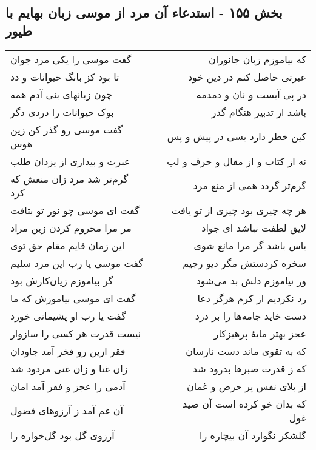 \begin{center}
\section*{بخش ۱۵۵ - استدعاء آن مرد از موسی زبان بهایم با طیور}
\label{sec:sh155}
\begin{longtable}{l p{0.5cm} r}
گفت موسی را یکی مرد جوان
&&
که بیاموزم زبان جانوران
\\
تا بود کز بانگ حیوانات و دد
&&
عبرتی حاصل کنم در دین خود
\\
چون زبانهای بنی آدم همه
&&
در پی آبست و نان و دمدمه
\\
بوک حیوانات را دردی دگر
&&
باشد از تدبیر هنگام گذر
\\
گفت موسی رو گذر کن زین هوس
&&
کین خطر دارد بسی در پیش و پس
\\
عبرت و بیداری از یزدان طلب
&&
نه از کتاب و از مقال و حرف و لب
\\
گرم‌تر شد مرد زان منعش که کرد
&&
گرم‌تر گردد همی از منع مرد
\\
گفت ای موسی چو نور تو بتافت
&&
هر چه چیزی بود چیزی از تو یافت
\\
مر مرا محروم کردن زین مراد
&&
لایق لطفت نباشد ای جواد
\\
این زمان قایم مقام حق توی
&&
یاس باشد گر مرا مانع شوی
\\
گفت موسی یا رب این مرد سلیم
&&
سخره کردستش مگر دیو رجیم
\\
گر بیاموزم زیان‌کارش بود
&&
ور نیاموزم دلش بد می‌شود
\\
گفت ای موسی بیاموزش که ما
&&
رد نکردیم از کرم هرگز دعا
\\
گفت یا رب او پشیمانی خورد
&&
دست خاید جامه‌ها را بر درد
\\
نیست قدرت هر کسی را سازوار
&&
عجز بهتر مایهٔ پرهیزکار
\\
فقر ازین رو فخر آمد جاودان
&&
که به تقوی ماند دست نارسان
\\
زان غنا و زان غنی مردود شد
&&
که ز قدرت صبرها بدرود شد
\\
آدمی را عجز و فقر آمد امان
&&
از بلای نفس پر حرص و غمان
\\
آن غم آمد ز آرزوهای فضول
&&
که بدان خو کرده است آن صید غول
\\
آرزوی گل بود گل‌خواره را
&&
گلشکر نگوارد آن بیچاره را
\\
\end{longtable}
\end{center}
